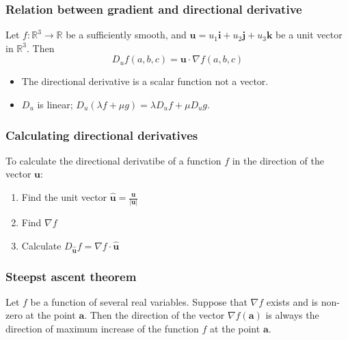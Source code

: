 \documentclass[12pt]{article}
\begin{document}
		\subsubsection{Relation between gradient and directional derivative}
		\begin{thm}
			Let $f:\mathbb{R}^3 \to \mathbb{R}$ be a sufficiently smooth, and $\mathbf{u} = u_1 \mathbf{i} + u_2 \mathbf{j} + u_3 \mathbf{k}$ 
			be a unit vector in $\mathbb{R}^3$. Then
			\[
				D_u f(a,b,c) = \mathbf{u} \cdot \nabla f(a,b,c)
			\]
		\end{thm}
		
		\begin{itemize}
			\item The directional derivative is a scalar function not a vector.
			\item $D_u$ is linear; $D_u(\lambda f + \mu g) = \lambda D_u f + \mu D_u g$.
		\end{itemize}
		
		\subsubsection{Calculating directional derivatives}
		To calculate the directional derivatibe of a function $f$ in the direction of the vector $\mathbf{u}$:
		\begin{enumerate}
			\item Find the unit vector $\hat{\mathbf{u}} = \frac{\mathbf{u}}{|\mathbf{u}|}$
			\item Find $\nabla f$
			\item Calculate $D_{\hat{\mathbf{u}}} f = \nabla f \cdot \hat{\mathbf{u}}$
		\end{enumerate}
		
		\subsubsection{Steepst ascent theorem}
		\begin{thm}
			Let $f$ be a function of several real variables. Suppose that $\nabla f$ exists and is non-zero at the point $\mathbf{a}$. 
			Then the direction of the vector $\nabla f(\mathbf{a})$ is always the direction of maximum increase of the function $f$ at the point $\mathbf{a}$.
		\end{thm}
		
\end{document}
